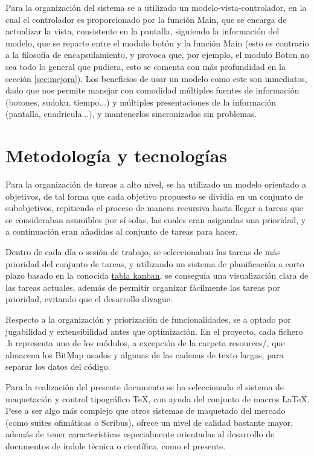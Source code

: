 \documentclass[12pt,letterpaper]{article}
\begin{document}
Para la organización del sistema se a utilizado un
modelo-vista-controlador, en la cual el controlador es proporcionado
por la función Main, que se encarga de actualizar la vista,
consistente en la pantalla, siguiendo la información del modelo, que
se reparte entre el modulo botón y la función Main (esto es contrario
a la filosofía de encapsulamiento, y provoca que, por ejemplo, el
modulo Boton no sea todo lo general que pudiera, esto se comenta con
más profundidad en la sección \ref{sec:mejora}). Los beneficios de
usar un modelo como este son inmediatos, dado que nos permite manejar
con comodidad múltiples fuentes de información (botones, sudoku,
tiempo...) y múltiples presentaciones de la información (pantalla,
cuadricula...), y mantenerlos sincronizados sin problemas.

\section{Metodología y tecnologías}
\label{sec:metodologias-tecnologias}
\label{sec:metodologias}
\label{sec:tecnologias}
Para la organización de tareas a alto nivel, se ha utilizado un modelo
orientado a objetivos, de tal forma que cada objetivo propuesto se
dividía en un conjunto de subobjetivos, repitiendo el proceso de
manera recursiva hasta llegar a tareas que se consideraban asumibles
por sí solas, las cuales eran asignadas una prioridad, y a
continuación eran añadidas al conjunto de tareas para hacer.

Dentro de cada día o sesión de trabajo, se seleccionaban las tareas de
más prioridad del conjunto de tareas, y utilizando un sistema de
planificación a corto plazo basado en la conocida
\href{https://en.wikipedia.org/wiki/Kanban\_board}{tabla kanban}, se
conseguía una visualización clara de las tareas actuales, además de
permitir organizar fácilmente las tareas por prioridad, evitando que
el desarrollo divague.

Respecto a la organización y priorización de funcionalidades, se a
optado por jugabilidad y extensibilidad antes que optimización. En el
proyecto, cada fichero .h representa uno de los módulos, a excepción
de la carpeta resources/, que almacena los BitMap usados y algunas de
las cadenas de texto largas, para separar los datos del código.

Para la realización del presente documento se ha seleccionado el
sistema de maquetación y control tipográfico \TeX, con ayuda del
conjunto de macros \LaTeX. Pese a ser algo más complejo que otros
sistemas de maquetado del mercado (como suites ofimáticas o Scribus),
ofrece un nivel de calidad bastante mayor, además de tener
características especialmente orientadas al desarrollo de documentos
de índole técnica o científica, como el presente.
\end{document}
